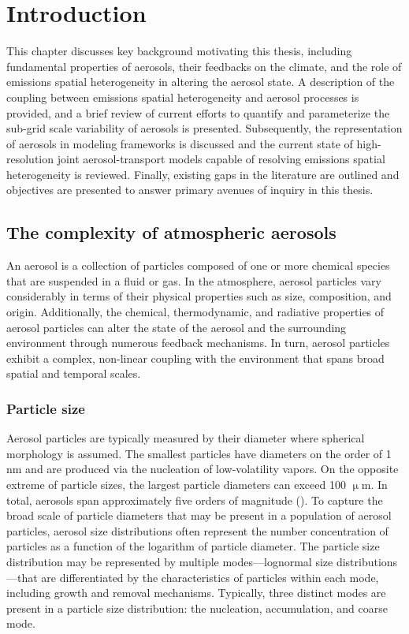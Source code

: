 \chapter{Introduction}

This chapter discusses key background motivating this thesis, including fundamental properties of aerosols, their feedbacks on the climate, and the role of emissions spatial heterogeneity in altering the aerosol state. A description of the coupling between emissions spatial heterogeneity and aerosol processes is provided, and a brief review of current efforts to quantify and parameterize the sub-grid scale variability of aerosols is presented. Subsequently, the representation of aerosols in modeling frameworks is discussed and the current state of high-resolution joint aerosol-transport models capable of resolving emissions spatial heterogeneity is reviewed. Finally, existing gaps in the literature are outlined and objectives are presented to answer primary avenues of inquiry in this thesis. 

\section{The complexity of atmospheric aerosols}\label{aerosol_properties}

An aerosol is a collection of particles composed of one or more chemical species that are suspended in a fluid or gas. In the atmosphere, aerosol particles vary considerably in terms of their physical properties such as size, composition, and origin. Additionally, the chemical, thermodynamic, and radiative properties of aerosol particles can alter the state of the aerosol and the surrounding environment through numerous feedback mechanisms. In turn, aerosol particles exhibit a complex, non-linear coupling with the environment that spans broad spatial and temporal scales.

\subsection{Particle size}
Aerosol particles are typically measured by their diameter where spherical morphology is assumed. The smallest particles have diameters on the order of 1 nm and are produced via the nucleation of low-volatility vapors. On the opposite extreme of particle sizes, the largest particle diameters can exceed 100 $\upmu$m. In total, aerosols span approximately five orders of magnitude (\cite{seinfeld_atmospheric_1998}). To capture the broad scale of particle diameters that may be present in a population of aerosol particles, aerosol size distributions often represent the number concentration of particles as a function of the logarithm of particle diameter. The particle size distribution may be represented by multiple modes---lognormal size distributions---that are differentiated by the characteristics of particles within each mode, including growth and removal mechanisms. Typically, three distinct modes are present in a particle size distribution: the nucleation, accumulation, and coarse mode. 


